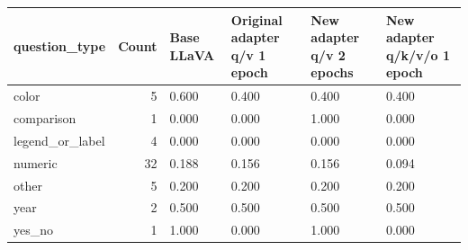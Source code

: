 \begin{tabular}{lrllll}
\toprule
question\_type & Count & Base LLaVA & Original adapter q/v 1 epoch & New adapter q/v 2 epochs & New adapter q/k/v/o 1 epoch \\
\midrule
color & 5 & 0.600 & 0.400 & 0.400 & 0.400 \\
comparison & 1 & 0.000 & 0.000 & 1.000 & 0.000 \\
legend\_or\_label & 4 & 0.000 & 0.000 & 0.000 & 0.000 \\
numeric & 32 & 0.188 & 0.156 & 0.156 & 0.094 \\
other & 5 & 0.200 & 0.200 & 0.200 & 0.200 \\
year & 2 & 0.500 & 0.500 & 0.500 & 0.500 \\
yes\_no & 1 & 1.000 & 0.000 & 1.000 & 0.000 \\
\bottomrule
\end{tabular}
